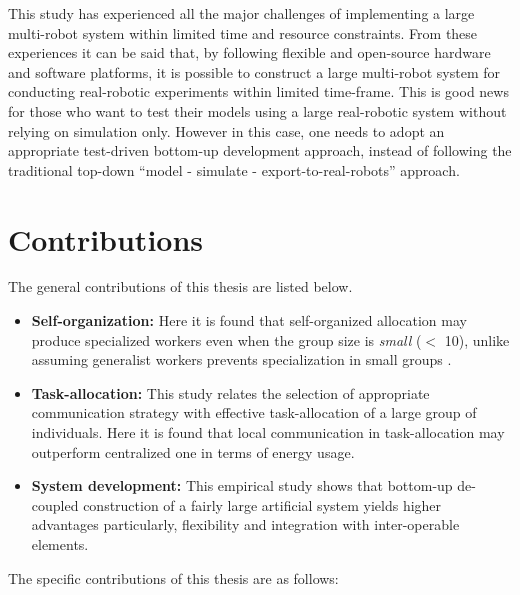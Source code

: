 This study has experienced all the major challenges of implementing a large multi-robot system within limited time and resource constraints. From these experiences it can be said that, by following flexible and open-source hardware and software platforms, it is possible to construct a large multi-robot system for conducting real-robotic experiments within limited time-frame. This is good news for those who want to test their models using a large real-robotic system without relying on simulation only. However in this case, one needs to adopt an appropriate test-driven bottom-up development approach, instead of following the traditional top-down ``model - simulate -  export-to-real-robots'' approach. 
\section{Contributions}
The general contributions of this thesis are listed below.
\begin{itemize}
    \item \textbf{Self-organization: } 
Here it is found that self-organized allocation may produce specialized workers even when the group size is \textit{small} ($<$ 10), unlike assuming generalist workers prevents specialization in small groups \cite{Garnier+2007}.
    \item \textbf{Task-allocation: }
This study relates the selection of appropriate communication strategy with effective task-allocation of a large group of individuals. Here it is found that local communication in task-allocation may outperform centralized one in terms of energy usage.
\item \textbf{System development: }
This empirical study shows that bottom-up de-coupled construction of a fairly large artificial system yields higher advantages particularly, flexibility and integration with inter-operable elements.%
\end{itemize}
The specific contributions of this thesis are as follows:
